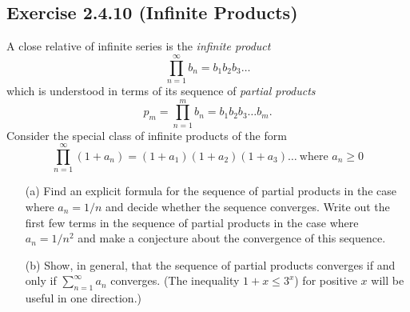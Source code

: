 \subsection{Exercise 2.4.10 (Infinite Products)}
A close relative of infinite series is the \textit{infinite product} 
\[ \prod_{n=1}^{ \infty } b_n = b_1 b_2 b_3 \dots \]
which is understood in terms of its sequence of \textit{partial products}
\[ p_m = \prod_{n=1}^m b_n = b_1b_2b_3 \dots b_m.\]
Consider the special class of infinite products of the form 
\[ \prod_{n=1}^{ \infty} (1 + a_n) = (1+a_1)(1+a_2)(1+a_3) \dots ~ \text{where } a_n \geq 0 \]
\begin{enumerate}
    \item[(a)] Find an explicit formula for the sequence of partial products in the case where \( a_n = 1 / n \) and decide whether the sequence converges. Write out the first few terms in the sequence of partial products in the case where \( a_n = 1 / n^2\) and make a conjecture about the convergence of this sequence.
    \item[(b)] Show, in general, that the sequence of partial products converges if and only if \( \sum_{n=1}^{ \infty} a_n \) converges. (The inequality \( 1 + x \leq 3^x\)) for positive \( x \) will be useful in one direction.)
\end{enumerate}





































